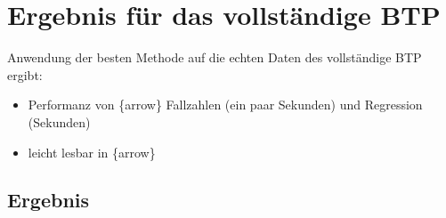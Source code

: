\documentclass[
  german,
  10pt,
  twoside]{article}
\makeatletter
\providecommand{\tightlist}{%
  \setlength{\itemsep}{0pt}\setlength{\parskip}{0pt}}
\newcommand{\berlintime}{%
  \berlinhr=\time\relax
  \divide\berlinhr by 60\relax
  \berlinmin=\time\relax
  \multiply\berlinhr by -60\relax
  \advance\berlinmin by \berlinhr\relax
  \berlinhr=\time\relax
  \divide\berlinhr by 60\relax
  \advance\berlinhr by 1\relax
  \ifnum\berlinhr>23\relax
    \advance\berlinhr by -24\relax
  \fi
  \ifnum\berlinhr<10 0\fi\the\berlinhr:\ifnum\berlinmin<10 0\fi\the\berlinmin%
}
\newif\ifdraftmode
\providecommand{\totalchars}{0}
\providecommand{\totalwords}{0}
\providecommand{\abstractchars}{0}
\providecommand{\abstractwords}{0}
\providecommand{\zusammenfassungchars}{0}
\providecommand{\zusammenfassungwords}{0}
\providecommand{\footnotecountnum}{0}
\providecommand{\citationcountnum}{0}
\newcommand{\doctitle}{$title$}
\newcommand{\docauthors}{$author-short$}
\newcommand{\docpublication}{$publication$}
\newcommand{\docpublicationissue}{$publication-issue$}
\newcommand{\metadatapage}{%
  \clearpage
  \thispagestyle{empty}
  \onecolumn
  \vspace*{1.5cm}
  
  {\raggedright
  {\LARGE\bfseries\color{wistaBlue} Dokument-Metadaten}\\[0.5cm]
  
  \begin{tabular}{@{}ll}
    \textbf{Titel:} & \doctitle \\[0.3em]
    \textbf{Autoren:} & \docauthors \\[0.3em]
    \textbf{Veröffentlichung:} & \docpublication\ \docpublicationissue \\[0.3em]
    \textbf{Erstellungsdatum:} & \today\ um \berlintime\ Uhr \\[0.3em]
  \end{tabular}
  
  \vspace{0.5cm}
  {\color{wistaBlue}\rule{\textwidth}{1pt}}
  \par}
  
  \vspace{1cm}
  
  {\large\bfseries\color{wistaDarkGray} Dokumentstatistik}\\[0.5cm]
  
  \small
  \begin{tabular}{@{}lrrrrrr@{}}
    \toprule
    \textbf{Abschnitt} & \textbf{Wörter} & \textbf{Zeichen} & \textbf{Fußn.} & \textbf{Quellen} & \textbf{Vorgabe} \\
    \midrule
    Insgesamt & \textcolor{wistaBlue}{\textbf{\totalwords}} & \textcolor{wistaBlue}{\textbf{\totalchars}} & \textcolor{wistaBlue}{\textbf{\footnotecountnum}} & \textcolor{wistaBlue}{\textbf{\citationcountnum}} & 30\,000 Z. \\
    Zusammenfassung & \textcolor{wistaBlue}{\textbf{\zusammenfassungwords}} & \textcolor{wistaBlue}{\textbf{\zusammenfassungchars}} & --- & --- & 800 Z. \\
    Abstract & \textcolor{wistaBlue}{\textbf{\abstractwords}} & \textcolor{wistaBlue}{\textbf{\abstractchars}} & --- & --- & 700 Z. \\
    \midrule
    \sectionrows
    \bottomrule
  \end{tabular}
  \normalsize
  
  \vspace{0.5cm}
  
  {\large\bfseries\color{wistaDarkGray} Schlüsselwörter}\\[0.3cm]
  \small
  \schlusselworterlist
  \normalsize
  
  \vspace{0.5cm}
  
  {\large\bfseries\color{wistaDarkGray} Keywords}\\[0.3cm]
  \small
  \keywordslist
  \normalsize
  
  \vspace{1cm}
  
  {\large\bfseries\color{wistaDarkGray} Tabellen}\\[0.3cm]
  
  \small
  \begin{tabular}{@{}lp{12cm}@{}}
    \toprule
    \textbf{Nr.} & \textbf{Beschreibung} \\
    \midrule
    \tablerows
    \bottomrule
  \end{tabular}
  \normalsize
  
  \vspace{1cm}
  
  {\large\bfseries\color{wistaDarkGray} Abbildungen}\\[0.3cm]
  
  \small
  \begin{tabular}{@{}lp{12cm}@{}}
    \toprule
    \textbf{Nr.} & \textbf{Beschreibung} \\
    \midrule
    \figurerows
    \bottomrule
  \end{tabular}
  \normalsize
  
  \clearpage
}
\makeatother
\begin{document}
\newcommand{\tablerows}{            \hyperref[tbl-pkg-versions]{Tabelle~1} & Versionen verfügbarer R-Packages \\
            \hyperref[tbl-baseline]{Tabelle~2} & Baselines in SAS und Stata (anhand 1\% des simuliertes BTP) \\
            \hyperref[tbl-benchmark-small]{Tabelle~3} & Performanz Messungen für die Fallzahlberechnung anhand 1\% des BTP \\
            \hyperref[tbl-benchmark-regr-small]{Tabelle~4} & Performanz Messungen für die Regressionsberechnung anhand 1\% des BTP \\
            \hyperref[tbl-benchmark]{Tabelle~5} & Performanz Messungen für die Fallzahlberechnung anhand 10\% des BTP \\
            \hyperref[tbl-benchmark-regr]{Tabelle~6} & Performanz Messungen für die Regressionsberechnung anhand 10\% des BTP \\
            \hyperref[tbl-bm-cnt-small]{Tabelle~7} & Benchmarkergebnisse für Fallzahlen (kleine Stichproben des BTP) \\
            \hyperref[tbl-bm-reg-small]{Tabelle~8} & Benchmarkergebnisse für Regression (kleine Stichproben des BTP) \\
}
\newcommand{\figurerows}{            \hyperref[fig-optimization-strategies]{Abbildung~1} & Strategien zur Performanz-Optimierung im FDZ-Bund \\
}
\newcommand{\schlusselworterlist}{}
\newcommand{\keywordslist}{}
\ifdraftmode
\metadatapage
\fi

\setcounter{subsection}{4}

\section{Ergebnis für das vollständige BTP}\label{sec-ergebnis}

Anwendung der besten Methode auf die echten Daten des vollständige BTP
ergibt:

\begin{itemize}
\tightlist
\item
  Performanz von \{arrow\} Fallzahlen (ein paar Sekunden) und Regression
  (Sekunden)
\item
  leicht lesbar in \{arrow\}
\end{itemize}

\subsection{Ergebnis}\label{ergebnis}
\end{document}
